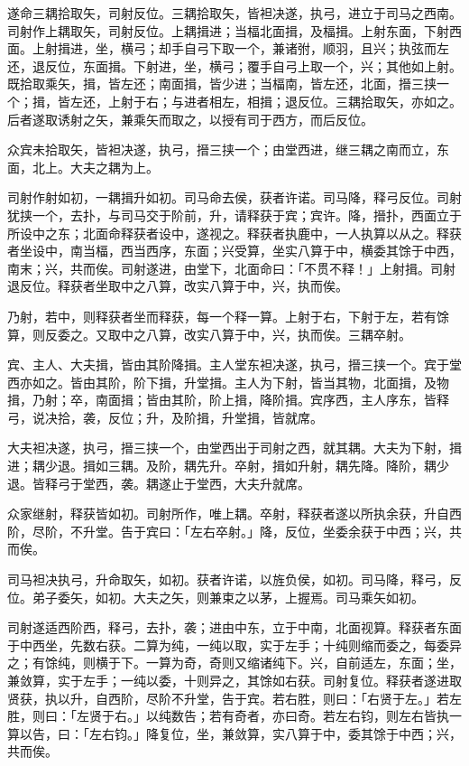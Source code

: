 \documentclass[]{article}
\begin{document}
遂命三耦拾取矢，司射反位。三耦拾取矢，皆袒决遂，执弓，进立于司马之西南。司射作上耦取矢，司射反位。上耦揖进；当楅北面揖，及楅揖。上射东面，下射西面。上射揖进，坐，横弓；却手自弓下取一个，兼诸弣，顺羽，且兴；执弦而左还，退反位，东面揖。下射进，坐，横弓；覆手自弓上取一个，兴；其他如上射。既拾取乘矢，揖，皆左还；南面揖，皆少进；当楅南，皆左还，北面，搢三挟一个；揖，皆左还，上射于右；与进者相左，相揖；退反位。三耦拾取矢，亦如之。后者遂取诱射之矢，兼乘矢而取之，以授有司于西方，而后反位。

众宾未拾取矢，皆袒决遂，执弓，搢三挟一个；由堂西进，继三耦之南而立，东面，北上。大夫之耦为上。

司射作射如初，一耦揖升如初。司马命去侯，获者许诺。司马降，释弓反位。司射犹挟一个，去扑，与司马交于阶前，升，请释获于宾；宾许。降，搢扑，西面立于所设中之东；北面命释获者设中，遂视之。释获者执鹿中，一人执算以从之。释获者坐设中，南当楅，西当西序，东面；兴受算，坐实八算于中，横委其馀于中西，南末；兴，共而俟。司射遂进，由堂下，北面命曰：「不贯不释！」上射揖。司射退反位。释获者坐取中之八算，改实八算于中，兴，执而俟。

乃射，若中，则释获者坐而释获，每一个释一算。上射于右，下射于左，若有馀算，则反委之。又取中之八算，改实八算于中，兴，执而俟。三耦卒射。

宾、主人、大夫揖，皆由其阶降揖。主人堂东袒决遂，执弓，搢三挟一个。宾于堂西亦如之。皆由其阶，阶下揖，升堂揖。主人为下射，皆当其物，北面揖，及物揖，乃射；卒，南面揖；皆由其阶，阶上揖，降阶揖。宾序西，主人序东，皆释弓，说决拾，袭，反位；升，及阶揖，升堂揖，皆就席。

大夫袒决遂，执弓，搢三挟一个，由堂西出于司射之西，就其耦。大夫为下射，揖进；耦少退。揖如三耦。及阶，耦先升。卒射，揖如升射，耦先降。降阶，耦少退。皆释弓于堂西，袭。耦遂止于堂西，大夫升就席。

众家继射，释获皆如初。司射所作，唯上耦。卒射，释获者遂以所执余获，升自西阶，尽阶，不升堂。告于宾曰：「左右卒射。」降，反位，坐委余获于中西；兴，共而俟。

司马袒决执弓，升命取矢，如初。获者许诺，以旌负侯，如初。司马降，释弓，反位。弟子委矢，如初。大夫之矢，则兼束之以茅，上握焉。司马乘矢如初。

司射遂适西阶西，释弓，去扑，袭；进由中东，立于中南，北面视算。释获者东面于中西坐，先数右获。二算为纯，一纯以取，实于左手；十纯则缩而委之，每委异之；有馀纯，则横于下。一算为奇，奇则又缩诸纯下。兴，自前适左，东面；坐，兼敛算，实于左手；一纯以委，十则异之，其馀如右获。司射复位。释获者遂进取贤获，执以升，自西阶，尽阶不升堂，告于宾。若右胜，则曰：「右贤于左。」若左胜，则曰：「左贤于右。」以纯数告；若有奇者，亦曰奇。若左右钧，则左右皆执一算以告，曰：「左右钧。」降复位，坐，兼敛算，实八算于中，委其馀于中西；兴，共而俟。
\end{document}
